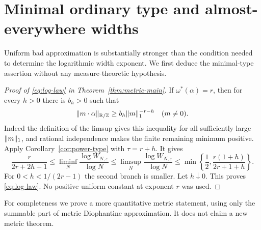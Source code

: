 \section{Minimal ordinary type and almost-everywhere widths}\label{sec:metric}
Uniform bad approximation is substantially stronger than the condition needed to determine the logarithmic width exponent. We first deduce the minimal-type assertion without any measure-theoretic hypothesis.

\begin{proof}[Proof of \eqref{eq:log-law} in Theorem~\ref{thm:metric-main}]
If $\omega^*(\alpha)=r$, then for every $h>0$ there is $b_h>0$ such that
\[
 \lVert m\cdot\alpha\rVert_{\mathbb R/\mathbb Z}\ge b_h\lVert m\rVert_1^{-r-h}
                          \quad(m\ne0).
\]
Indeed the definition of the limsup gives this inequality for all sufficiently large $\lVert m\rVert_1$, and rational independence makes the finite remaining minimum positive. Apply Corollary~\ref{cor:power-type} with $\tau=r+h$. It gives
\[
 \frac{r}{2r+2h+1}\le
 \liminf_N\frac{\log W_{N,\varepsilon}}{\log N}
 \le\limsup_N\frac{\log W_{N,\varepsilon}}{\log N}
 \le\min\left\{\frac12,\frac{r(1+h)}{2r+1+h}\right\}.
\]
For $0<h<1/(2r-1)$ the second branch is smaller. Let $h\downarrow0$. This proves \eqref{eq:log-law}. No positive uniform constant at exponent $r$ was used.
\end{proof}

For completeness we prove a more quantitative metric statement, using only the summable part of metric Diophantine approximation. It does not claim a new metric theorem.

